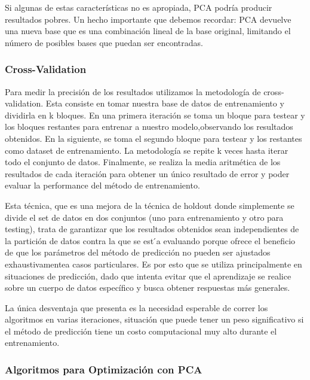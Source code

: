 Si algunas de estas características no es apropiada, PCA podría producir resultados pobres. Un hecho importante que debemos recordar: PCA devuelve una nueva base que es una combinación lineal de la base original, limitando el número de posibles bases que puedan ser encontradas.


\subsubsection {Cross-Validation}

Para medir la precisión de los resultados utilizamos la metodología de cross-validation. Esta consiste en tomar nuestra base de datos de entrenamiento y dividirla en k bloques. En una primera iteración se toma un bloque para testear y los bloques restantes para entrenar a nuestro modelo,observando los resultados obtenidos. En la siguiente, se toma el segundo bloque para testear y los
restantes como dataset de entrenamiento.
La metodología se repite k veces hasta iterar todo el conjunto de datos. Finalmente, se realiza la media aritmética de los resultados de cada iteración para obtener un único resultado de error y poder evaluar la performance del método de entrenamiento.

Esta técnica, que es una mejora de la técnica de holdout donde simplemente se divide el set de datos en dos conjuntos (uno para entrenamiento y otro para testing), trata de garantizar que los resultados obtenidos sean independientes de la partición de datos contra la que se est ́a evaluando porque ofrece el beneficio de que los parámetros del método de predicción no pueden ser ajustados exhaustivamentea casos particulares. Es por esto que se utiliza principalmente en situaciones de predicción, dado que intenta evitar que el aprendizaje se realice sobre un cuerpo de datos específico y busca obtener respuestas más generales.

La única desventaja que presenta es la necesidad esperable de correr los algoritmos en varias iteraciones, situación que puede tener un peso significativo si el método de predicción tiene un costo computacional muy alto durante el entrenamiento.


\subsubsection {Algoritmos para Optimización con PCA}

